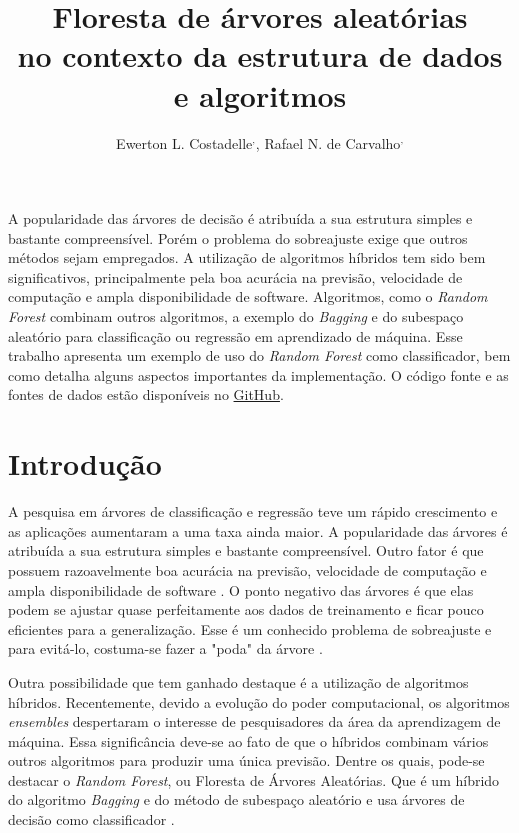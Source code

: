 \documentclass[12pt]{article}
\title{Floresta de árvores aleatórias \\ no contexto da estrutura de dados e algoritmos}
\author{Ewerton L. Costadelle\inst{1}$^{,}$\inst{2}, Rafael N. de Carvalho\inst{1}$^{,}$\inst{2}}
\begin{document}
 

\maketitle

\begin{resumo} 
  A popularidade das árvores de decisão é atribuída a sua estrutura simples e bastante compreensível. Porém o problema do sobreajuste exige que outros métodos sejam empregados. A utilização de algoritmos híbridos tem sido bem significativos, principalmente pela boa acurácia na previsão, velocidade de computação e ampla disponibilidade de software. Algoritmos, como o \emph{Random Forest} combinam outros algoritmos, a exemplo do \emph{Bagging} e do subespaço aleatório para classificação ou regressão em aprendizado de máquina. Esse trabalho apresenta um exemplo de uso do \textit{Random Forest} como classificador, bem como detalha alguns aspectos importantes da implementação. O código fonte e as fontes de dados estão disponíveis no \href{https://github.com/ecostadelle/SBC}{GitHub}.
\end{resumo}


\section{Introdução}

A pesquisa em árvores de classificação e regressão teve um rápido crescimento e as aplicações aumentaram a uma taxa ainda maior. A popularidade das árvores é atribuída a sua estrutura simples e bastante compreensível. Outro fator é que possuem razoavelmente boa acurácia na previsão, velocidade de computação e ampla disponibilidade de software \cite{Loh_2014}. O ponto negativo das árvores é que elas podem se ajustar quase perfeitamente aos dados de treinamento e ficar pouco eficientes para a generalização. Esse é um conhecido problema de sobreajuste e para evitá-lo, costuma-se fazer a "poda" da árvore \cite{Grus_2019}.

Outra possibilidade que tem ganhado destaque é a utilização de algoritmos híbridos. Recentemente, devido a evolução do poder computacional, os algoritmos \emph{ensembles} despertaram o interesse de pesquisadores da área da aprendizagem de máquina. Essa significância deve-se ao fato de que o híbridos combinam vários outros algoritmos para produzir uma única previsão. Dentre os quais, pode-se destacar o \textit{Random Forest}, ou Floresta de Árvores Aleatórias. Que é um híbrido do algoritmo \emph{Bagging} e do método de subespaço aleatório e usa árvores de decisão como classificador \cite{Buhmann_2011}.
\end{document}
